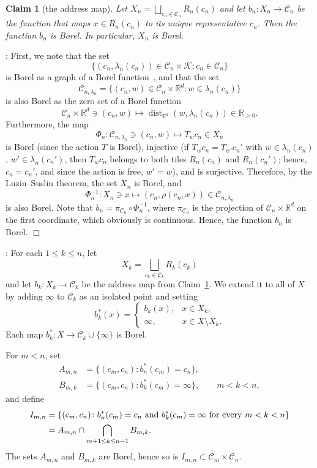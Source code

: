 \documentclass[11pt]{paper}
\newtheorem{claim}{Claim}
\newcommand{\bR}{\mathbb R}
\newcommand{\cC}{\mathcal C}
\newcommand{\cK}{\mathcal K}
\newcommand{\la}{\lambda}
\begin{document}
\begin{claim}[the address map]\label{claim2}
Let $X_n = \bigsqcup_{c_n\in\cC_n} R_n(c_n)$ and let
$b_n\colon X_n\to \cC_n$ be the function that maps $x\in R_n(c_n)$ to its unique representative
$c_n$. Then the function $b_n$ is Borel. In particular, $X_n$ is Borel.
\end{claim}

: First, we note that the set
\[ \{(c_n, \la_n(c_n))\in \cC_n \times \cK\colon c_n\in\cC_n\}\] is Borel as a graph of a Borel
function~\cite[Theorem~12.4]{Kechris}, and that the set
\[ \cC_{n, \la_n} = \{(c_n, w)\in \cC_n\times\bR^d\colon w\in\la_n(c_n)\}\] is also Borel as the zero set
of a Borel function
\[
\cC_n \times \bR^d \ni (c_n, w) \mapsto \operatorname{dist}_{\bR^d} (w, \la_n(c_n)) \in\bR_{\ge 0}.
\]
Furthermore, the map
\[
\Phi_n\colon \cC_{n, \la_n} \ni (c_n, w) \mapsto T_w c_n \in X_n
\]
is Borel (since the action $T$ is Borel), injective (if $T_w c_n = T_{w'}c_n'$ with $w\in\la_n(c_n)$,
$w'\in \la_n(c_n')$, then $T_w c_n$ belongs to both tiles $R_n(c_n)$ and $R_n(c_n')$; hence,
$c_n=c_n'$, and since the action is free, $w'=w$), and is surjective. Therefore, by the Luzin--Suslin theorem,
the set $X_n$ is Borel, and
\[
\Phi_n^{-1}\colon X_n \ni x \mapsto (c_n, \rho(c_n, x))\in \cC_{n, \la_n}
\]
 is also Borel. Note that $b_n = \pi_{\cC_n} \circ \Phi_n^{-1}$, where $\pi_{\cC_n}$ is the
projection of $\cC_n\times \bR^d$ on the first coordinate, which obviously is continuous. Hence, the function
$b_n$ is Borel. \hfill $\Box$

\medskip{}:
For each $1\le k\le n$, let
\[
X_k=\bigsqcup_{c_k\in\cC_k}R_k(c_k)
\]
and let $b_k\colon X_k\to\cC_k$ be the address map from Claim~\ref{claim2}. We extend it to all of $X$ by adding
$\infty$ to $\cC_k$ as an isolated point and setting
\[
b_k^*(x) =
\begin{cases}
b_k(x), & x\in X_k, \\
\infty, & x\in X\setminus X_k.
\end{cases}
\]
Each map $b_k^*\colon X\to\cC_k\cup\{\infty\}$ is Borel.

For $m<n$, set
\begin{align*}
A_{m, n} &= \{(c_m, c_n): b_n^*(c_m)=c_n\}, \\
B_{m, k} &= \{(c_m, c_n)\colon b_k^*(c_m)=\infty\},\qquad m<k<n,
\end{align*}
and define
\begin{align*}
I_{m, n} &=
\{(c_m, c_n)\colon b_n^*(c_m)=c_n
\ {\rm and\ } b_k^*(c_m)=\infty\ {\rm for\ every\ }m<k<n \} \\
&= A_{m, n} \cap \bigcap_{m+1\le k \le n-1} B_{m, k}.
\end{align*}
The sets $A_{m,n}$ and $B_{m,k}$ are Borel, hence so is $I_{m,n}\subset\cC_m\times\cC_n$.
\end{document}
